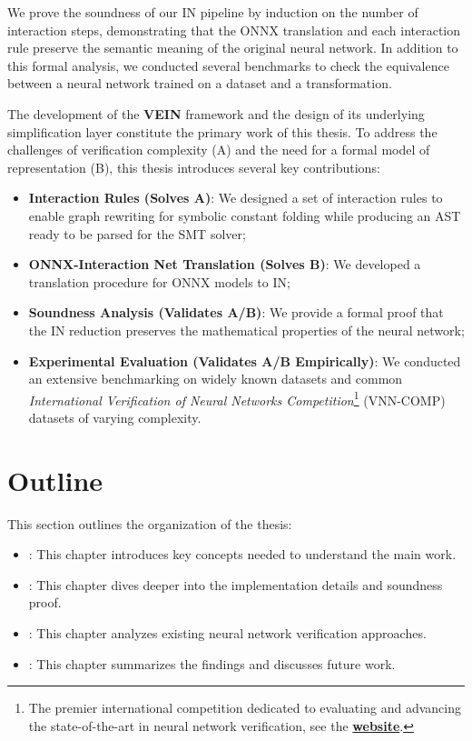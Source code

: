 We prove the soundness of our IN pipeline by induction on the number of interaction steps,
demonstrating that the ONNX translation and each interaction rule preserve the semantic meaning of
the original neural network. In addition to this formal analysis, we conducted several benchmarks to
check the equivalence between a neural network trained on a dataset and a transformation.

The development of the \textbf{VEIN} framework and the design of its underlying simplification layer
constitute the primary work of this thesis. To address the challenges of verification complexity (A)
and the need for a formal model of representation (B), this thesis introduces several key
contributions:
\begin{itemize}
	\item \textbf{Interaction Rules (Solves A)}: We designed a set of interaction rules to enable graph
		rewriting for symbolic constant folding while producing an AST ready to be parsed for the SMT
		solver;
	\item \textbf{ONNX-Interaction Net Translation (Solves B)}: We developed a translation procedure for ONNX
		models to IN;
	\item \textbf{Soundness Analysis (Validates A/B)}: We provide a formal proof that the IN reduction
		preserves the mathematical properties of the neural network;
	\item \textbf{Experimental Evaluation (Validates A/B Empirically)}: We conducted an extensive benchmarking
		on widely known datasets and common \textit{International Verification of Neural Networks
		Competition}\footnote{The premier international competition dedicated to evaluating and advancing
		the state-of-the-art in neural network verification, see the
		\href{https://vnn-comp.github.io/}{\textbf{website}}.} (VNN-COMP) datasets of varying complexity.
\end{itemize}

\section{Outline}
\label{sec:outline}
This section outlines the organization of the thesis:
\begin{itemize}
	\item \textbf{}: This chapter introduces key concepts needed to understand the
		main work.
	\item \textbf{}: This chapter dives deeper into the implementation details and
		soundness proof.
	\item \textbf{}: This chapter analyzes existing neural network verification
		approaches.
	\item \textbf{}: This chapter summarizes the findings and discusses future
		work.
\end{itemize}
